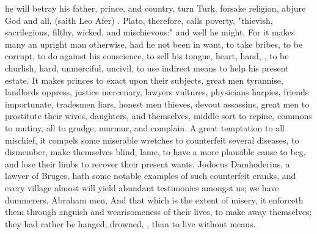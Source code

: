 %
he will betray his father, prince, and country, turn Turk, forsake religion,
abjure God and all, 
(saith Leo Afer) .
Plato, therefore, calls poverty, "thievish, sacrilegious,
filthy, wicked, and mischievous:" and well he might. For it makes many an
upright man otherwise, had he not been in want, to take bribes, to be corrupt,
to do against his conscience, to sell his tongue, heart, hand, \etc{}, to be
churlish, hard, unmerciful, uncivil, to use indirect means to help his present
estate. It makes princes to exact upon their subjects, great men tyrannise,
landlords oppress, justice mercenary, lawyers vultures, physicians harpies,
friends importunate, tradesmen liars, honest men thieves, devout assassins,
great men to prostitute their wives, daughters, and themselves, middle sort to
repine, commons to mutiny, all to grudge, murmur, and complain. A great
temptation to all mischief, it compels some miserable wretches to counterfeit
several diseases, to dismember, make themselves blind, lame, to have a more
plausible cause to beg, and lose their limbs to recover their present wants.
Jodocus Damhoderius, a lawyer of Bruges,  hath some notable examples of such counterfeit cranks, and
every village almost will yield abundant testimonies amongst us; we have
dummerers, Abraham men, \etc{} And that which is the extent of misery, it
enforceth them through anguish and wearisomeness of their lives, to make away
themselves; they had rather be hanged, drowned, \etc{}, than to live without
means.


